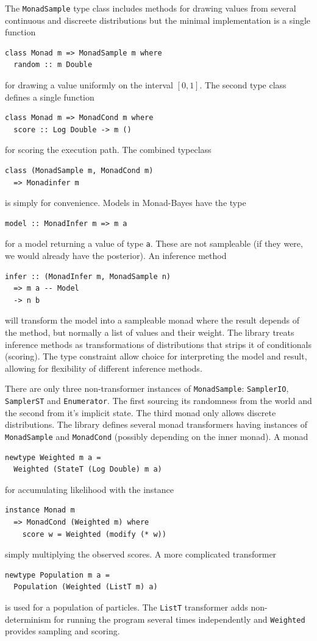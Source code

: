 The \texttt{MonadSample} type class includes methods for drawing values from
several continuous and discreete distributions but the minimal implementation is
a single function
\begin{verbatim}
class Monad m => MonadSample m where
  random :: m Double
  \end{verbatim}
for drawing a value uniformly on the interval $[0,1]$. The second type class
defines a single function
\begin{verbatim}
class Monad m => MonadCond m where
  score :: Log Double -> m ()
  \end{verbatim}
for scoring the execution path. The combined typeclass
\begin{verbatim}
class (MonadSample m, MonadCond m)
  => Monadinfer m
\end{verbatim}
is simply for convenience.
Models in Monad-Bayes have the type
\begin{verbatim}
model :: MonadInfer m => m a
\end{verbatim}
for a model returning a value of type \texttt{a}. These are not sampleable (if they were, we would already have the posterior). An inference method
\begin{verbatim}
infer :: (MonadInfer m, MonadSample n)
  => m a -- Model
  -> n b
\end{verbatim}
will transform the model into a sampleable monad where the result depends of the method, but normally a list of values and their weight. The library treats inference methods as transformations of distributions that strips it of conditionals (scoring). The type constraint allow choice for interpreting the model and result, allowing for flexibility of different inference methods.

There are only three non-transformer instances of \texttt{MonadSample}: \texttt{SamplerIO}, \texttt{SamplerST} and \texttt{Enumerator}. The first sourcing its randomness from the world and the second from it's implicit state. The third monad only allows discrete distributions. The library defines several monad transformers having instances of \texttt{MonadSample} and \texttt{MonadCond} (possibly depending on the inner monad). A monad
\begin{verbatim}
newtype Weighted m a =
  Weighted (StateT (Log Double) m a)
\end{verbatim}
for accumulating likelihood with the instance
\begin{verbatim}
instance Monad m
  => MonadCond (Weighted m) where
    score w = Weighted (modify (* w))
\end{verbatim}
simply multiplying the observed scores. A more complicated transformer
\begin{verbatim}
newtype Population m a =
  Population (Weighted (ListT m) a)
\end{verbatim}
is used for a population of particles. The \texttt{ListT} transformer adds non-determinism for running the program several times independently and \texttt{Weighted} provides sampling and scoring.

